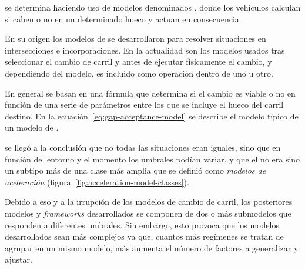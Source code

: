  se determina haciendo uso de modelos denominados \textit{}, donde los vehículos calculan si caben o no en un determinado hueco y actuan en consecuencia.

En su origen los modelos de \textit{} se desarrollaron para resolver situaciones en intersecciones e incorporaciones. En la actualidad son los modelos usados tras seleccionar el cambio de carril y antes de ejecutar físicamente el cambio, y dependiendo del modelo, es incluido como operación dentro de uno u otro.

En general se basan en una fórmula que determina si el cambio es viable o no en función de una serie de parámetros entre los que se incluye el hueco del carril destino. En la ecuación~\ref{eq:gap-acceptance-model} se describe el modelo típico de un modelo de \textit{}. 


 se llegó a la conclusión que no todas las situaciones eran iguales, sino que en función del entorno y el momento los umbrales podían variar, y que el \textit{} no era sino un subtipo más de una clase más amplia que se definió como \textit{modelos de aceleración} (figura~\ref{fig:acceleration-model-classes}).

Debido a eso y a la irrupción de los modelos de cambio de carril, los posteriores modelos y \textit{frameworks} desarrollados se componen de dos o más submodelos que responden a diferentes umbrales. Sin embargo, esto provoca que los modelos desarrollados sean más complejos ya que, cuantos más regímenes se tratan de agrupar en un mismo modelo, más aumenta el número de factores a generalizar y ajustar.


